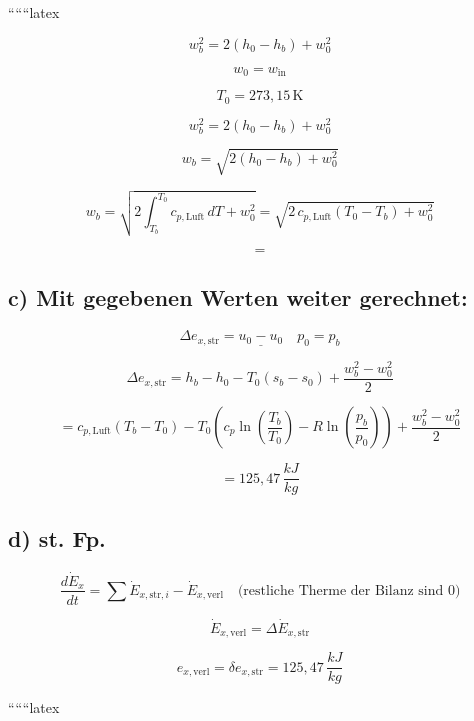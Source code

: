 ``````latex


\[
w_{b}^2 = 2 \left( h_0 - h_b \right) + w_0^2
\]

\[
w_0 = w_{\text{in}} 
\]

\[
T_0 = 273{,}15 \, \text{K}
\]

\[
w_{b}^2 = 2 \left( h_0 - h_b \right) + w_0^2
\]

\[
w_{b} = \sqrt{2 \left( h_0 - h_b \right) + w_0^2}
\]

\[
w_{b} = \sqrt{2 \int_{T_b}^{T_0} c_{p,\text{Luft}} \, dT + w_0^2} = \sqrt{2 \, c_{p,\text{Luft}} \left( T_0 - T_b \right) + w_0^2}
\]

\[
=
\]

\subsection*{c) Mit gegebenen Werten weiter gerechnet:}

\[
\Delta e_{x,\text{str}} = \underline{u_0 - u_0} \quad p_0 = p_b
\]

\[
\Delta e_{x,\text{str}} = h_b - h_0 - T_0 \left( s_b - s_0 \right) + \frac{w_b^2 - w_0^2}{2}
\]

\[
= c_{p,\text{Luft}} \left( T_b - T_0 \right) - T_0 \left( c_p \ln \left( \frac{T_b}{T_0} \right) - R \ln \left( \frac{p_b}{p_0} \right) \right) + \frac{w_b^2 - w_0^2}{2}
\]

\[
= 125{,}47 \, \frac{kJ}{kg}
\]

\subsection*{d) st. Fp.}

\[
\frac{d\dot{E}_x}{dt} = \sum \dot{E}_{x,\text{str},i} - \dot{E}_{x,\text{verl}} \quad \text{(restliche Therme der Bilanz sind 0)}
\]

\[
\dot{E}_{x,\text{verl}} = \Delta \dot{E}_{x,\text{str}}
\]

\[
e_{x,\text{verl}} = \delta e_{x,\text{str}} = 125{,}47 \, \frac{kJ}{kg}
\]

``````latex


